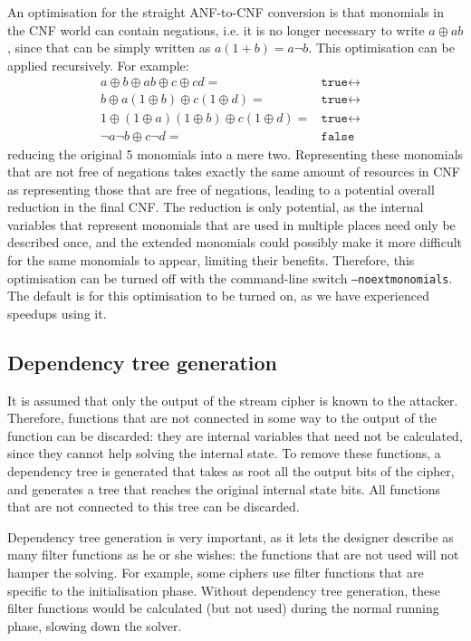\documentclass{llncs}
\begin{document}
An optimisation for the straight ANF-to-CNF conversion is that monomials in the CNF world can contain negations, i.e. it is no longer necessary to write $a \oplus ab$, since that can be simply written as $a(1+b)=a\neg b$. This optimisation can be applied recursively. For example:
\begin{align*}
a \oplus b \oplus ab \oplus c \oplus cd =& \texttt{true}
\leftrightarrow&\\
b \oplus a(1\oplus b) \oplus c(1\oplus d) =& \texttt{true}
\leftrightarrow&\\
1 \oplus (1\oplus a)(1\oplus b) \oplus c(1\oplus d) =& \texttt{true}
\leftrightarrow&\\
\neg a\neg b \oplus c\neg d =& \texttt{false}
\end{align*}
reducing the original 5 monomials into a mere two. Representing these monomials that are not free of negations takes exactly the same amount of resources in CNF as representing those that are free of negations, leading to a potential overall reduction in the final CNF. The reduction is only potential, as the internal variables that represent monomials that are used in multiple places need only be described once, and the extended monomials could possibly make it more difficult for the same monomials to appear, limiting their benefits. Therefore, this optimisation can be turned off with the command-line switch \texttt{--noextmonomials}. The default is for this optimisation to be turned on, as we have experienced speedups using it.

\subsection{Dependency tree generation}
It is assumed that only the output of the stream cipher is known to the attacker. Therefore, functions that are not connected in some way to the output of the function can be discarded: they are internal variables that need not be calculated, since they cannot help solving the internal state. To remove these functions, a dependency tree is generated that takes as root all the output bits of the cipher, and generates a tree that reaches the original internal state bits. All functions that are not connected to this tree can be discarded.

Dependency tree generation is very important, as it lets the designer describe as many filter functions as he or she wishes: the functions that are not used will not hamper the solving. For example, some ciphers use filter functions that are specific to the initialisation phase. Without dependency tree generation, these filter functions would be calculated (but not used) during the normal running phase, slowing down the solver.
\end{document}

